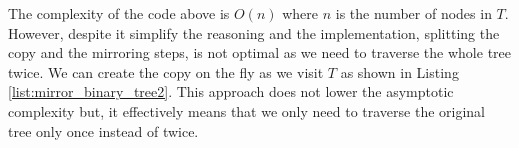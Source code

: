 The complexity of the code above is $O(n)$ where $n$ is the number of nodes in $T$.
However, despite it simplify the reasoning and the implementation,
splitting the copy and the mirroring steps, is not optimal as we need to traverse the whole tree twice. 
We can create the copy on the fly as we visit $T$ as shown in Listing \ref{list:mirror_binary_tree2}. 
This approach does not lower the asymptotic complexity but, it effectively means that 
we only need to traverse the original tree only once instead of twice. 




